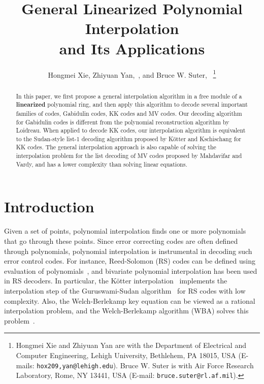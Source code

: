 \documentclass[11pt,onecolumn,draftcls]{IEEEtran}
\begin{document}
\title{General Linearized Polynomial Interpolation\\and Its Applications}

\author{Hongmei Xie, Zhiyuan Yan,~, and Bruce W. Suter,~
\thanks{Hongmei Xie and Zhiyuan Yan are with the Department of Electrical and Computer
Engineering, Lehigh University, Bethlehem, PA 18015, USA (E-mails:
{\tt hox209,yan@lehigh.edu}). Bruce W. Suter is with Air Force Research Laboratory, Rome, NY 13441, USA
(E-mail: {\tt bruce.suter@rl.af.mil}).}}

\maketitle

\thispagestyle{empty}
\begin{abstract}
In this paper, we first propose a general interpolation algorithm in a free module of a \textbf{linearized} polynomial ring, and then apply this algorithm to decode several important families of codes, Gabidulin codes, KK codes and MV codes. Our decoding algorithm for Gabidulin codes is different from the polynomial reconstruction algorithm by Loidreau. When applied to decode KK codes, our interpolation algorithm is equivalent to the Sudan-style list-1 decoding algorithm proposed by K\"{o}tter and Kschischang for KK codes. The general interpolation approach is also capable of solving the interpolation problem for the list decoding of MV codes proposed by Mahdavifar and Vardy, and has a lower complexity than solving linear equations.
\end{abstract}


\section{Introduction}\label{sec:intro}
Given a set of points, polynomial interpolation finds one or more polynomials that go through these points. Since error correcting codes are often defined through polynomials, polynomial interpolation is instrumental in decoding such error control codes. For instance, Reed-Solomon (RS) codes can be defined using evaluation of polynomials~\cite{RothBookRS}, and bivariate polynomial interpolation has been used in RS decoders. In particular, the K\"{o}tter interpolation~\cite{kotter_it96} implements the interpolation step of the Guruswami-Sudan algorithm~\cite{GS99} for RS codes with low complexity. Also, the Welch-Berlekamp key equation can be viewed as a rational interpolation problem, and the Welch-Berlekamp algorithm (WBA) solves this problem~\cite{WelchBerlekamp86}.
\end{document}

